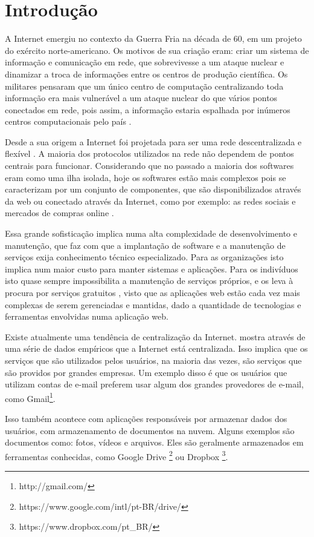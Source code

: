 \chapter{Introdução}
\label{cap-introducao}

A Internet emergiu no contexto da Guerra Fria na década
de 60, em um projeto do exército norte-americano. Os motivos de sua criação eram:
criar um sistema de informação e comunicação em rede, que
sobrevivesse a um ataque nuclear e dinamizar a troca de informações entre os centros de
produção científica. Os militares pensaram que um único centro de computação
centralizando toda informação era mais vulnerável a um ataque nuclear do que vários
pontos conectados em rede, pois assim, a informação estaria espalhada por inúmeros
centros computacionais pelo país \cite{giles2010psychology}.

Desde a sua origem a Internet foi projetada para ser uma rede
descentralizada e flexível \cite{galaxia}. A maioria dos protocolos
utilizados na rede não dependem de pontos centrais para funcionar. 
Considerando que no
passado a maioria dos softwares eram como uma ilha isolada, hoje os softwares 
estão mais complexos pois se caracterizam por um conjunto de componentes, que 
são disponibilizados através da web ou conectado através da Internet,
como por exemplo: as redes sociais e mercados de compras online \cite{byhand}.

Essa grande sofisticação implica numa alta complexidade de
desenvolvimento e manutenção, que faz com que a
implantação de software e a manutenção de serviços exija conhecimento técnico
especializado. Para as organizações isto implica num maior
custo para manter sistemas e aplicações. Para os indivíduos isto quase sempre
impossibilita a manutenção de serviços próprios, e os leva à procura por serviços
gratuitos \cite{shak2015}, visto que as aplicações web estão cada vez mais complexas de serem gerenciadas e mantidas, dado a quantidade de tecnologias e ferramentas envolvidas numa aplicação web.

Existe atualmente uma tendência de centralização da Internet. 
mostra
através de uma série de dados empíricos que a Internet está centralizada. Isso
implica que os serviços que são utilizados pelos usuários, na maioria
das vezes, são serviços que são providos por grandes empresas. 
Um exemplo disso é que os usuários que utilizam contas de e-mail preferem usar algum
dos grandes provedores de e-mail, como Gmail\footnote{http://gmail.com/}. 

Isso também acontece com aplicações responsáveis por armazenar dados dos usuários,
com armazenamento de documentos na nuvem. Alguns exemplos são 
documentos como: fotos, vídeos e arquivos. Eles são geralmente armazenados em 
ferramentas conhecidas, como Google Drive 
\footnote{https://www.google.com/intl/pt-BR/drive/} ou Dropbox \footnote{https://www.dropbox.com/pt\_BR/}. 


